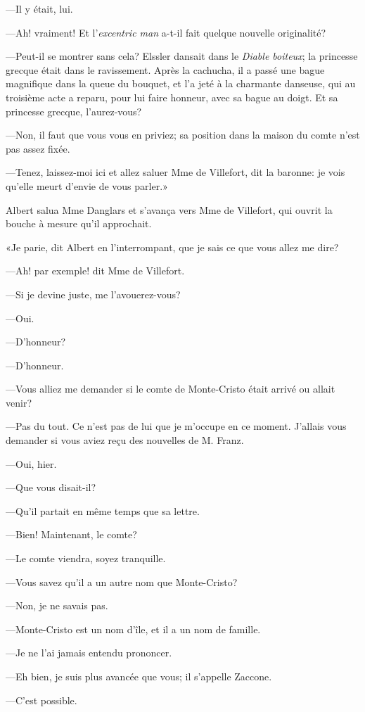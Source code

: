 —Il y était, lui. 

—Ah! vraiment! Et l'\textit{excentric man} a-t-il fait quelque nouvelle originalité? 

—Peut-il se montrer sans cela? Elssler dansait dans le \textit{Diable boiteux}; la princesse grecque était dans le ravissement. Après la cachucha, il a passé une bague magnifique dans la queue du bouquet, et l'a jeté à la charmante danseuse, qui au troisième acte a reparu, pour lui faire honneur, avec sa bague au doigt. Et sa princesse grecque, l'aurez-vous? 

—Non, il faut que vous vous en priviez; sa position dans la maison du comte n'est pas assez fixée. 

—Tenez, laissez-moi ici et allez saluer Mme de Villefort, dit la baronne: je vois qu'elle meurt d'envie de vous parler.» 

Albert salua Mme Danglars et s'avança vers Mme de Villefort, qui ouvrit la bouche à mesure qu'il approchait. 

«Je parie, dit Albert en l'interrompant, que je sais ce que vous allez me dire? 

—Ah! par exemple! dit Mme de Villefort. 

—Si je devine juste, me l'avouerez-vous? 

—Oui. 

—D'honneur? 

—D'honneur. 

—Vous alliez me demander si le comte de Monte-Cristo était arrivé ou allait venir? 

—Pas du tout. Ce n'est pas de lui que je m'occupe en ce moment. J'allais vous demander si vous aviez reçu des nouvelles de M. Franz. 

—Oui, hier. 

—Que vous disait-il? 

—Qu'il partait en même temps que sa lettre. 

—Bien! Maintenant, le comte? 

—Le comte viendra, soyez tranquille. 

—Vous savez qu'il a un autre nom que Monte-Cristo? 

—Non, je ne savais pas. 

—Monte-Cristo est un nom d'île, et il a un nom de famille. 

—Je ne l'ai jamais entendu prononcer. 

—Eh bien, je suis plus avancée que vous; il s'appelle Zaccone. 

—C'est possible. 

